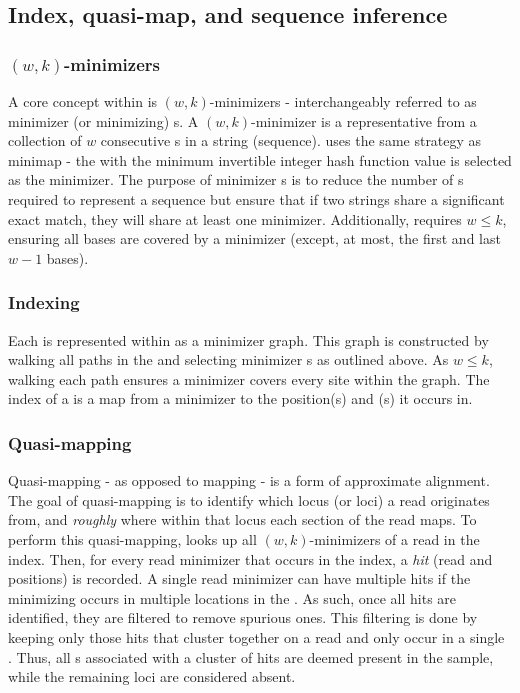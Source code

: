 \subsection{Index, quasi-map, and sequence inference}

\subsubsection{$(w,k)$-minimizers}
A core concept within \pandora{} is $(w,k)$-minimizers \cite{Roberts2004} - interchangeably referred to as minimizer (or minimizing) \kmer{}s. A $(w,k)$-minimizer is a representative \kmer{} from a collection of $w$ consecutive \kmer{}s in a string (sequence). \pandora{} uses the same strategy as minimap \cite{minimap2016} - the \kmer{} with the minimum invertible integer hash function value is selected as the minimizer. The purpose of minimizer \kmer{}s is to reduce the number of \kmer{}s required to represent a sequence but ensure that if two strings share a significant exact match, they will share at least one minimizer. Additionally, \pandora{} requires $w\le k$, ensuring all \prg{} bases are covered by a minimizer (except, at most, the first and last $w-1$ bases).

\subsubsection{Indexing}
Each \prg{} is represented within \pandora{} as a minimizer \kmer{} graph. This graph is constructed by walking all paths in the \prg{} and selecting minimizer \kmer{}s as outlined above. As $w\le k$, walking each path ensures a minimizer covers every site within the graph. The index of a \panrg{} is a map from a minimizer \kmer{} to the position(s) and \prg{}(s) it occurs in. 

\subsubsection{Quasi-mapping}
\label{sec:quasi-map}
Quasi-mapping - as opposed to mapping - is a form of approximate alignment. The goal of quasi-mapping is to identify which locus (or loci) a read originates from, and \emph{roughly} where within that locus each section of the read maps. To perform this quasi-mapping, \pandora{} looks up all $(w,k)$-minimizers of a read in the index. Then, for every read minimizer that occurs in the index, a \emph{hit} (read and \prg{} positions) is recorded. A single read minimizer can have multiple hits if the minimizing \kmer{} occurs in multiple locations in the \panrg{}. As such, once all hits are identified, they are filtered to remove spurious ones. This filtering is done by keeping only those hits that cluster together on a read and only occur in a single \prg{}. Thus, all \prg{}s associated with a cluster of hits are deemed present in the sample, while the remaining loci are considered absent.

